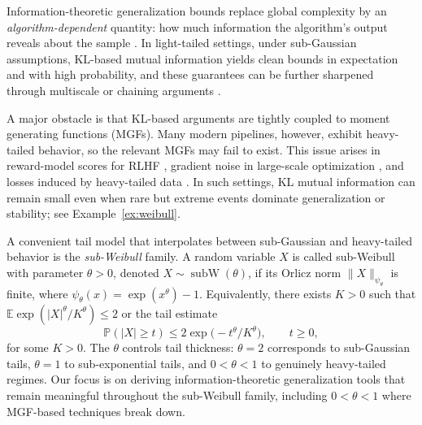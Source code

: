\documentclass[11pt]{article}
\providecommand{\subw}{\operatorname{subW}}
\begin{document}
Information-theoretic generalization bounds replace global complexity by an
\emph{algorithm-dependent} quantity: how much information the algorithm's
output reveals about the sample \citep{xu2017,Russo20,bu2020}. In
light-tailed settings, under sub-Gaussian assumptions, KL-based
mutual information yields clean bounds in expectation and with high
probability, and these guarantees can be further sharpened through multiscale
or chaining arguments \citep{asadi2018chaining,hellstrom2025generalization}.




A major obstacle is that KL-based arguments are tightly coupled to moment
generating functions (MGFs). Many modern pipelines, however, exhibit
heavy-tailed behavior, so the relevant MGFs may fail to exist. This issue
arises in reward-model scores for RLHF \citep{kwa2024catastrophic}, gradient noise in large-scale
optimization \citep{raj2023algorithmic}, and losses induced by heavy-tailed data
\citep{lerasle2019lecture, xu2023non}. In such settings, KL mutual information
can remain small even when rare but extreme events dominate generalization or
stability; see Example~\ref{ex:weibull}.




A convenient tail model that interpolates between sub-Gaussian and heavy-tailed
behavior is the \emph{sub-Weibull} family. 
A random variable $X$ is called sub-Weibull with parameter $\theta>0$, denoted
$X\sim\subw(\theta)$, if its Orlicz norm $\|X\|_{\psi_\theta}$ is finite, where
$\psi_\theta(x)=\exp(x^\theta)-1$. Equivalently, there exists $K>0$ such that
$\mathbb{E}\exp(|X|^\theta/K^\theta)\le 2$ or the tail estimate
\begin{equation}\label{tail-estimate}
\mathbb{P}(|X|\ge t)\le 2\exp\bigl(-t^\theta/K^\theta\bigr),\qquad t\ge 0,
\end{equation}
for some $K>0$. The $\theta$ controls tail thickness: $\theta=2$
corresponds to sub-Gaussian tails, $\theta=1$ to sub-exponential tails, and
$0<\theta<1$ to genuinely heavy-tailed regimes.  Our focus is on deriving
information-theoretic generalization tools that remain meaningful throughout the
sub-Weibull family, including $0<\theta<1$ where MGF-based techniques break down.
\end{document}
